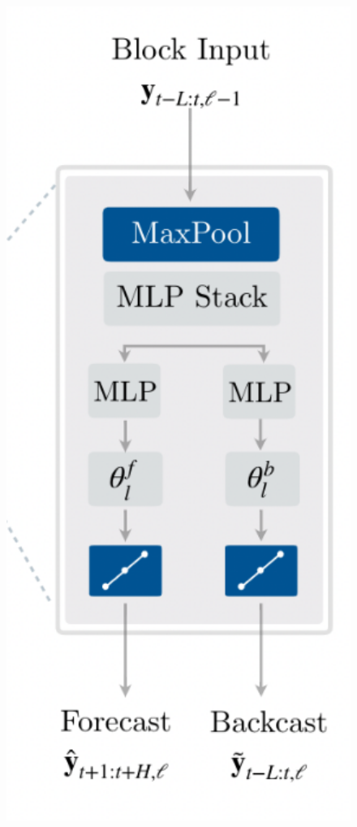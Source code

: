 \documentclass{ieeeojies}
\begin{document}
\begin{figure}[H]
    \centering
    \begin{minipage}{0.15\textwidth}
    \centering
    \includegraphics[width=1\textwidth]{N-HiTS Block Input.png}

\end{minipage}
\end{figure}
\end{document}

